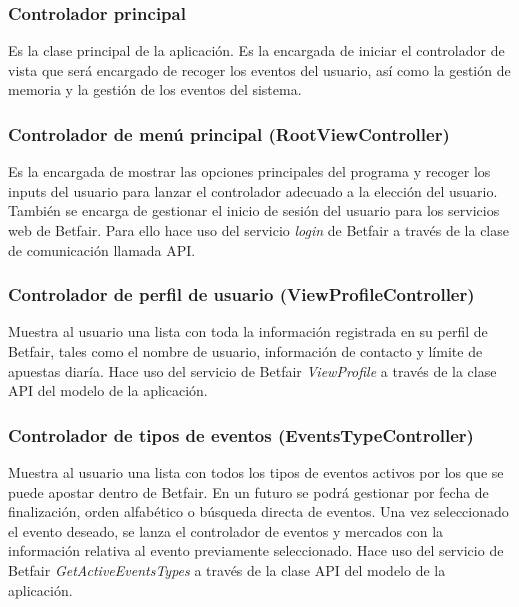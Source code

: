    
    
\subsubsection{Controlador principal}

 Es la clase principal de la aplicación. Es la encargada de iniciar el controlador de vista que será encargado de recoger los eventos del usuario, así como la gestión de memoria y la gestión de los eventos del sistema.
 
\subsubsection{Controlador de menú principal (RootViewController)}
 Es la encargada de mostrar las opciones principales del programa y recoger los inputs del usuario para lanzar el controlador adecuado a la elección del usuario. También se encarga de gestionar el inicio de sesión del usuario para los servicios web de Betfair. Para ello hace uso del servicio \emph{login} de Betfair a través de la clase de comunicación llamada API.
 
 \subsubsection{Controlador de perfil de usuario (ViewProfileController)}
 Muestra al usuario una lista con toda la información registrada en su perfil de Betfair, tales como el nombre de usuario, información de contacto y límite de apuestas diaría. Hace uso del servicio de Betfair \emph{ViewProfile}  a través de la clase API del modelo de la aplicación.
 
\subsubsection{Controlador de tipos de eventos (EventsTypeController)}
 Muestra al usuario una lista con todos los tipos de eventos activos por los que se puede apostar dentro de Betfair. En un futuro se podrá gestionar por fecha de finalización, orden alfabético o búsqueda directa de eventos. Una vez seleccionado el evento deseado, se lanza el controlador de eventos y mercados con la información relativa al evento previamente seleccionado. Hace uso del servicio de Betfair \emph{GetActiveEventsTypes}  a través de la clase API del modelo de la aplicación.
 
